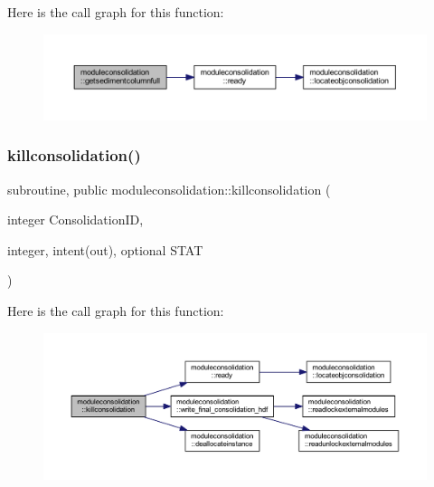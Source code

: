 Here is the call graph for this function\+:\nopagebreak
\begin{figure}[H]
\begin{center}
\leavevmode
\includegraphics[width=350pt]{namespacemoduleconsolidation_ae9552437552ade51a4c1aefcb033a0e7_cgraph}
\end{center}
\end{figure}
\mbox{\label{namespacemoduleconsolidation_accff619eab55fc89b79de8070dbd7001}} 
\subsubsection{\texorpdfstring{killconsolidation()}{killconsolidation()}}
{\footnotesize\ttfamily subroutine, public moduleconsolidation\+::killconsolidation (\begin{DoxyParamCaption}\item[{integer}]{Consolidation\+ID,  }\item[{integer, intent(out), optional}]{S\+T\+AT }\end{DoxyParamCaption})}

Here is the call graph for this function\+:\nopagebreak
\begin{figure}[H]
\begin{center}
\leavevmode
\includegraphics[width=350pt]{namespacemoduleconsolidation_accff619eab55fc89b79de8070dbd7001_cgraph}
\end{center}
\end{figure}
\mbox{\label{namespacemoduleconsolidation_a782ed1b2a1870dc38bceeca90e360669}} 
